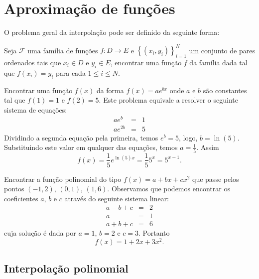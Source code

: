 \documentclass[main.tex]{subfiles}
\begin{document}
\chapter{Aproximação de funções}

O problema geral da interpolação pode ser definido da seguinte forma:

Seja $\mathcal{F}$ uma família de funções $f:D\to E$ e $\left\{(x_i,y_i)\right\}_{i=1}^N$ um conjunto de pares ordenados tais que $x_i\in D$ e $y_i\in E$, encontrar uma função $f$ da família dada tal que $f(x_i)=y_i$ para cada $1\leq i \leq N$.
\begin{ex} Encontrar uma função $f(x)$ da forma $f(x)=a e^{bx}$ onde $a$ e $b$ são constantes tal que $f(1)=1$ e $f(2)=5$. Este problema equivale a resolver o seguinte sistema de equações:
\begin{eqnarray*}
ae^b&=&1\\
ae^{2b}&=&5
\end{eqnarray*}
Dividindo a segunda equação pela primeira, temos $e^b=5$, logo, $b=\ln(5)$. Substituindo este valor em qualquer das equações, temos $a=\frac{1}{5}$. Assim $$f(x)=\frac{1}{5}e^{\ln(5) x}=\frac{1}{5}5^x=5^{x-1}.$$
\end{ex}

\begin{ex} Encontrar a função polinomial do tipo $f(x)=a+bx+cx^2$ que passe pelos pontos $(-1,2)$, $(0,1)$, $(1,6)$. Observamos que podemos encontrar os coeficientes $a$, $b$ e $c$ através do seguinte sistema linear:
\begin{eqnarray*}
a-b+c&=&2\\
a&=&1\\
a+b+c&=&6
\end{eqnarray*}
cuja solução é dada por $a=1$, $b=2$ e $c=3$. Portanto $$f(x)=1+2x+3x^2.$$
\end{ex}

\section{Interpolação polinomial}
\end{document}
